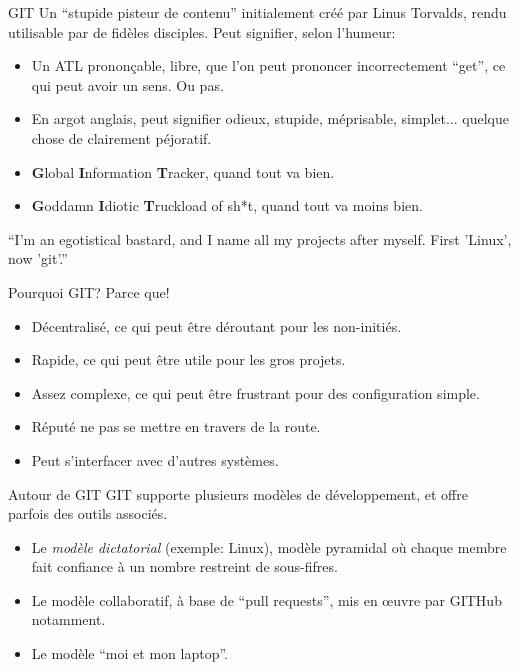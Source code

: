 \documentclass{beamer}
\begin{document}
\begin{frame}{GIT}
  Un ``stupide pisteur de contenu'' initialement créé par Linus Torvalds, rendu utilisable par de fidèles disciples.\linebreak
  Peut signifier, selon l'humeur:
  \begin{itemize}
  \item Un ATL prononçable, libre, que l'on peut prononcer incorrectement ``get'', ce qui peut avoir un sens. Ou pas.
  \item En argot anglais, peut signifier odieux, stupide, méprisable, simplet... quelque chose de clairement péjoratif.
  \item {\bf{G}}lobal {\bf{I}}nformation {\bf{T}}racker, quand tout va bien.
  \item {\bf{G}}oddamn {\bf{I}}diotic {\bf{T}}ruckload of sh*t, quand tout va moins bien.
  \end{itemize}
  ``I'm an egotistical bastard, and I name all my projects after myself. First 'Linux', now 'git'.''
\end{frame}

\begin{frame}{Pourquoi GIT?}
  Parce que!
  \begin{itemize}
  \item Décentralisé, ce qui peut être déroutant pour les non-initiés.
  \item Rapide, ce qui peut être utile pour les gros projets.
  \item Assez complexe, ce qui peut être frustrant pour des configuration simple.
  \item Réputé ne pas se mettre en travers de la route.
  \item Peut s'interfacer avec d'autres systèmes.
  \end{itemize}
\end{frame}

\begin{frame}{Autour de GIT}
  GIT supporte plusieurs modèles de développement, et offre parfois des outils associés.
  \begin{itemize}
  \item Le {\em modèle dictatorial} (exemple: Linux), modèle pyramidal où chaque membre fait confiance à un nombre restreint de sous-fifres.
  \item Le modèle collaboratif, à base de ``pull requests'', mis en œuvre par GITHub notamment.
  \item Le modèle ``moi et mon laptop''.
  \end{itemize}
\end{frame}
\end{document}
